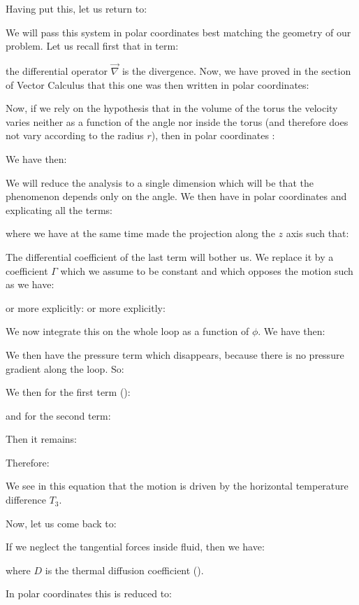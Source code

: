 	Having put this, let us return to:
	
	We will pass this system in polar coordinates best matching the geometry of our problem. Let us recall first that in term:
	
	the differential operator $\vec{\nabla}$ is the divergence. Now, we have proved in the section of Vector Calculus that this one was then written in polar coordinates:
	
	Now, if we rely on the hypothesis that in the volume of the torus the velocity varies neither as a function of the angle nor inside the torus (and therefore does not vary according to the radius $r$), then in polar coordinates :
	
	We have then:
	
	We will reduce the analysis to a single dimension which will be that the phenomenon depends only on the angle. We then have in polar coordinates and explicating all the terms:
	
	where we have at the same time made the projection along the $z$ axis such that:
	
	The differential coefficient of the last term will bother us. We replace it by a coefficient $\Gamma$ which we assume to be constant and which opposes the motion such as we have:
	
	or more explicitly:
	or more explicitly:
	
	We now integrate this on the whole loop as a function of $\phi$. We have then:
	
	We then have the pressure term which disappears, because there is no pressure gradient along the loop. So:
	
	We then for the first term ():
	
	and for the second term:
	
	Then it remains:
	
	Therefore:
	
	We see in this equation that the motion is driven by the horizontal temperature difference $T_3$.

	Now, let us come back to:
	
	If we neglect the tangential forces inside fluid, then we have:
	
	where $D$ is the thermal diffusion coefficient ().

	In polar coordinates this is reduced to:
	
